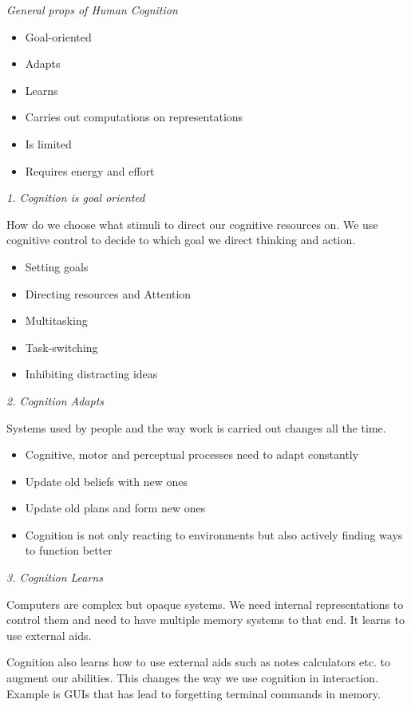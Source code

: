 \textit{General props of Human Cognition} \smallskip

\begin{itemize}[itemsep=-5pt, topsep=0pt, leftmargin=*]
	\item Goal-oriented
	\item Adapts
	\item Learns
	\item Carries out computations on representations
	\item Is limited
	\item Requires energy and effort
\end{itemize}


\textit{1. Cognition is goal oriented} \smallskip

How do we choose what stimuli to direct our cognitive resources on. We use cognitive control to decide to which goal we direct thinking and action.

\begin{itemize}[itemsep=-5pt, topsep=0pt, leftmargin=*]
	\item Setting goals
	\item Directing resources and Attention
	\item Multitasking
	\item Task-switching
	\item Inhibiting distracting ideas
\end{itemize} \medskip

\textit{2. Cognition Adapts} \smallskip

Systems used by people and the way work is carried out changes all the time. 
\begin{itemize}[itemsep=-5pt, topsep=0pt, leftmargin=*]
	\item Cognitive, motor and perceptual processes need to adapt constantly
	\item Update old beliefs with new ones
	\item Update old plans and form new ones
	\item Cognition is not only reacting to environments but also actively finding ways to function better
\end{itemize} \medskip


\textit{3. Cognition Learns} \smallskip

Computers are complex but opaque systems. We need internal representations to control them and need to have multiple memory systems to that end. 
It learns to use external aids. 

Cognition also learns how to use external aids such as notes calculators etc. to augment our abilities. This changes the way we use cognition in interaction. 
Example is GUIs that has lead to forgetting terminal commands in memory. 


